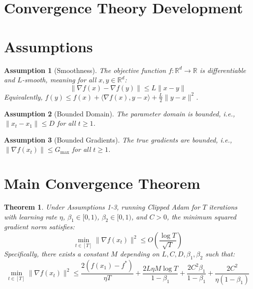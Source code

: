 \documentclass{article}
\newtheorem{theorem}{Theorem}
\newtheorem{assumption}{Assumption}
\begin{document}
\section*{Convergence Theory Development}
\section*{Assumptions}
\begin{assumption}[Smoothness]
The objective function $f: \mathbb{R}^d \to \mathbb{R}$ is differentiable and $L$-smooth, meaning for all $x, y \in \mathbb{R}^d$:
$$ \|\nabla f(x) - \nabla f(y)\| \leq L \|x - y\| $$
Equivalently, $f(y) \leq f(x) + \langle \nabla f(x), y - x \rangle + \frac{L}{2} \|y - x\|^2 $.
\end{assumption}

\begin{assumption}[Bounded Domain]
The parameter domain is bounded, i.e., $\|x_t - x_1\| \leq D$ for all $t \geq 1$.
\end{assumption}

\begin{assumption}[Bounded Gradients]
The true gradients are bounded, i.e., $\|\nabla f(x_t)\| \leq G_{\max}$ for all $t \geq 1$.
\end{assumption}

\section*{Main Convergence Theorem}
\begin{theorem}
Under Assumptions 1-3, running Clipped Adam for $T$ iterations with learning rate $\eta$, $\beta_1 \in [0, 1)$, $\beta_2 \in [0, 1)$, and $C > 0$, the minimum squared gradient norm satisfies:
$$ \min_{t \in [T]} \|\nabla f(x_t)\|^2 \leq O\left(\frac{\log T}{\sqrt{T}}\right) $$
Specifically, there exists a constant $M$ depending on $L, C, D, \beta_1, \beta_2$ such that:
$$ \min_{t \in [T]} \|\nabla f(x_t)\|^2 \leq \frac{2(f(x_1) - f^*)}{\eta T} + \frac{2L\eta M \log T}{1-\beta_1} + \frac{2C^2 \beta_1}{1-\beta_1} + \frac{2C^2}{\eta(1-\beta_1)} $$
\end{theorem}
\end{document}
